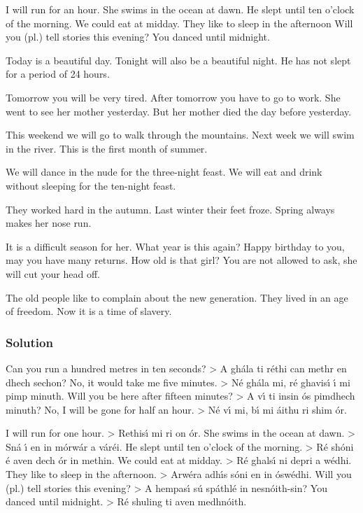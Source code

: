 I will run for an hour.
She swims in the ocean at dawn.
He slept until ten o’clock of the morning.
We could eat at midday.
They like to sleep in the afternoon
Will you (pl.) tell stories this evening?
You danced until midnight.

Today is a beautiful day.
Tonight will also be a beautiful night.
He has not slept for a period of 24 hours.

Tomorrow you will be very tired.
After tomorrow you have to go to work.
She went to see her mother yesterday.
But her mother died the day before yesterday.

This weekend we will go to walk through the mountains.
Next week we will swim in the river.
This is the first month of summer.

We will dance in the nude for the three-night feast.
We will eat and drink without sleeping for the ten-night feast.

They worked hard in the autumn.
Last winter their feet froze.
Spring always makes her nose run.

It is a difficult season for her.
What year is this again?
Happy birthday to you, may you have many returns.
How old is that girl?
You are not allowed to ask, she will cut your head off.

The old people like to complain about the new generation.
They lived in an age of freedom.
Now it is a time of slavery.

\newpage
\subsubsection{Solution}

Can you run a hundred metres in ten seconds? > A gh\'{a}la ti r\'{e}thi can methr en dhech sechon?
No, it would take me five minutes. > N\'{e} gh\'{a}la mi, r\'{e} ghavis\'{\i} \'{\i} mi pimp minuth.
Will you be here after fifteen minutes? > A v\'{\i} ti insin \'{o}s pimdhech minuth?
No, I will be gone for half an hour. > N\'{e} v\'{\i} mi, b\'{\i} mi \'{a}ithu ri shim \'{o}r.

I will run for one hour. > Rethis\'{\i} mi ri on \'{o}r.
She swims in the ocean at dawn. > Sn\'{a} \'{\i} en in m\'{o}rw\'{a}r a v\'{a}r\'{e}i.
He slept until ten o’clock of the morning. > R\'{e} sh\'{o}ni \'{e} aven dech \'{o}r in methin.
We could eat at midday. > R\'{e} ghals\'{\i} ni depri a w\'{e}dhi.
They like to sleep in the afternoon. > Arw\'{e}ra adh\'{\i}s s\'{o}ni en in \'{o}sw\'{e}dhi.
Will you (pl.) tell stories this evening? > A hempas\'{\i} s\'{u} sp\'{a}thl\'{e} in nesn\'{o}ith-sin?
You danced until midnight. > R\'{e} shuling ti aven medhn\'{o}ith.

